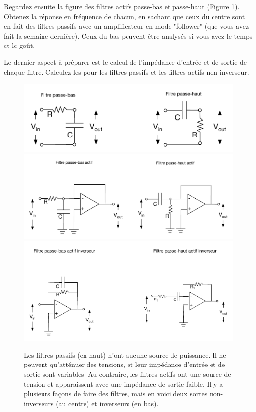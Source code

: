 \documentclass[canadien,12pt,oneside,letterpaper]{article}
\begin{document}
Regardez ensuite la figure des filtres actifs passe-bas et passe-haut (Figure \ref{fig:filtres}).  Obtenez la réponse en fréquence de chacun, en sachant que ceux du centre sont en fait des filtres passifs avec un amplificateur en mode "follower" (que vous avez fait la semaine dernière). Ceux du bas peuvent être analysés si vous avez le temps et le goût.

Le dernier aspect à préparer est le calcul de l'impédance d'entrée et de sortie de chaque filtre. Calculez-les pour les filtres passifs et les filtres actifs non-inverseur.

\begin{figure}[htbp]
   \centering
   \includegraphics[width=15cm]{Labos-Complements/Lab07/FiltresPassifs_vDC.pdf} 
   \includegraphics[width=15cm]{Labos-Complements/Lab07/FiltresActifsNonInverseurs_maisRCsur-_vDC.pdf} 
   \includegraphics[width=15cm]{Labos-Complements/Lab07/FiltresActifsInverseurs_vDC.pdf} 
   \caption{Les filtres passifs (en haut) n'ont aucune source de puissance.  Il ne peuvent qu'atténuer des tensions, et leur impédance d'entrée et de sortie sont variables.  Au contraire, les filtres actifs ont une source de tension et apparaissent avec une impédance de sortie faible. Il y a plusieurs façons de faire des filtres, mais en voici deux sortes non-inverseurs (au centre) et inverseurs (en bas).}
   \label{fig:filtres}
\end{figure}
\end{document}
